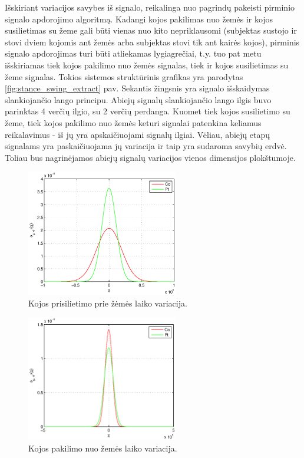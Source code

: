\documentclass[]{vgtuef}
\begin{document}
Išskiriant variacijos savybes iš signalo, reikalinga nuo pagrindų pakeisti pirminio signalo apdorojimo algoritmą. Kadangi kojos pakilimas nuo žemės ir kojos susilietimas su žeme gali būti vienas nuo kito nepriklausomi (subjektas sustojo ir stovi dviem kojomis ant žemės arba subjektas stovi tik ant kairės kojos), pirminis signalo apdorojimas turi būti atliekamas lygiagrečiai, t.y. tuo pat metu išskiriamas tiek kojos pakilimo nuo žemės signalas, tiek ir kojos susilietimas su žeme signalas. Tokios sistemos struktūrinis grafikas yra parodytas \ref{fig:stance_swing_extract} pav. Sekantis žingsnis yra signalo išskaidymas slankiojančio lango principu. Abiejų signalų slankiojančio lango ilgis buvo parinktas 4 verčių ilgio, su 2 verčių perdanga. Kuomet tiek kojos susilietimo su žeme, tiek kojos pakilimo nuo žemės keturi signalai patenkina keliamus reikalavimus - iš jų yra apskaičiuojami signalų ilgiai. Vėliau, abiejų etapų signalams yra paskaičiuojama jų variacija ir taip yra sudaroma savybių erdvė. Toliau bus nagrinėjamos abiejų signalų variacijos vienos dimensijos plokštumoje.

\begin{figure}[!t]
  \centering
  \includegraphics[width=250px]{figures/stance_phase.eps}
  \caption{Kojos prisilietimo prie žėmės laiko variacija.}
  \label{fig:stance_var}
\end{figure}

\begin{figure}[!t]
  \centering
  \includegraphics[width=250px]{figures/swing_phase.eps}
  \caption{Kojos pakilimo nuo žemės laiko variacija.}
  \label{fig:swing_var}
\end{figure}
\end{document}
